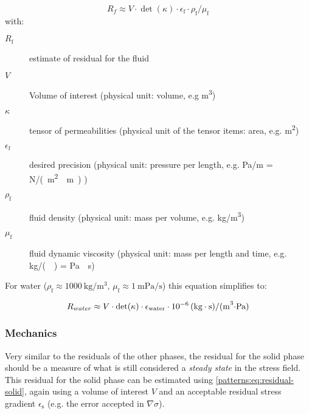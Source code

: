 \begin{equation}
  \label{patterns:eq:residual-fluid}
  R_{f} \approx V \cdot \det (\kappa) \cdot \epsilon_\mathrm{f} \cdot \rho_\mathrm{f} / \mu_\mathrm{f}
\end{equation}
with:
\begin{description}
  \item[$R_\mathrm{f}$] estimate of residual for the fluid
  \item[$V$] Volume of interest (physical unit: volume, e.g \unit{\cubic\metre})
  \item[$\kappa$] tensor of permeabilities (physical unit of the tensor items: area, e.g. \unit{\square\metre})
  \item[$\epsilon_\mathrm{f}$] desired precision (physical unit: pressure per length, e.g. \unit[per-mode = symbol]{\pascal\per\metre} = \unit[per-mode = symbol]{\newton\per(\square\metre\cdot\metre)} )
  \item[$\rho_\mathrm{f}$] fluid density (physical unit: mass per volume, e.g. \unit[per-mode = symbol]{\kilogram\per\cubic\metre})
  \item[$\mu_\mathrm{f}$] fluid dynamic viscosity (physical unit: mass per length and time, e.g. \unit[per-mode = symbol]{\kilogram\per({\metre\cdot\second})} = \unit[per-mode = symbol]{\pascal\cdot\second})
\end{description}

\vspace{1em}

For water ($\rho_\mathrm{f} \approx \qty[per-mode =
    symbol]{1000}{\kilogram\per\cubic\metre}$, $\mu_\mathrm{f} \approx
  \qty[per-mode = symbol]{1}{\milli\pascal\per\second}$) this equation simplifies
to:

\begin{equation}
  R_{water} \approx V \cdot \det (\kappa) \cdot \epsilon_\mathrm{water} \cdot \SI{E-6}{(\kilogram\cdot\second)\per(\cubic\metre\cdot\pascal)}
\end{equation}

\subsubsection{Mechanics}

Very similar to the residuals of the other phases, the residual for the solid
phase should be a measure of what is still considered a \emph{steady state} in
the stress field. This residual for the solid phase can be estimated using
\autoref{patterns:eq:residual-solid}, again using a volume of interest $V$ and
an acceptable residual stress gradient $\epsilon_\mathrm{s}$ (e.g. the error
accepted in $\nabla \sigma$).

